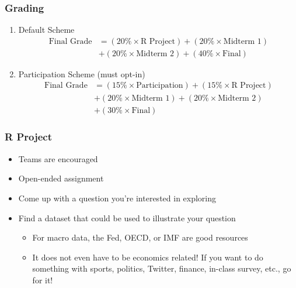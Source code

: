 \documentclass{beamer}
\begin{document}
\begin{frame}
\frametitle{Grading}
	\begin{enumerate}
		\item \alert{Default Scheme}
			\begin{align*}
			\text{Final Grade} &= (20\% \times \text{R Project}) + (20\% \times \text{Midterm 1})  
			\\
			&+ (20\% \times \text{Midterm 2}) + (40\% \times \text{Final})
			\end{align*}
		\item \alert{Participation Scheme (must opt-in)}
			\begin{align*}
			\text{Final Grade} &= (15\% \times \text{Participation}) + (15\% \times \text{R Project})
			\\
			&+ (20\% \times \text{Midterm 1}) + (20\% \times \text{Midterm 2})
			\\
			&+ (30\% \times \text{Final})
			\end{align*}
	\end{enumerate}
\end{frame}

\begin{frame}
\frametitle{R Project}
	\begin{itemize}[<+- | alert@+>]
		\item Teams are encouraged		
		\item Open-ended assignment
		\item Come up with a question you're interested in exploring
		\item Find a dataset that could be used to illustrate your question
		\begin{itemize}
			\item For macro data, the Fed, OECD, or IMF are good resources
			\item It does not even have to be economics related! If you want to do something with 				sports, politics, Twitter, finance, in-class survey, etc., go for it!
		\end{itemize}
	\end{itemize}
\end{frame}
\end{document}
